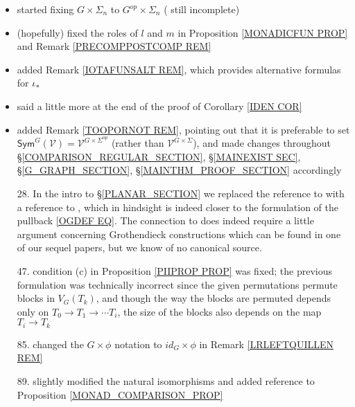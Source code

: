 \documentclass{article}
\begin{document}
\begin{itemize}
	\item started fixing $G \times \Sigma_n$ 
	to 
	$G^{op} \times \Sigma_n$
	({\color{red} still incomplete})
	
	\item (hopefully) fixed the roles of $l$ and $m$ in 
	Proposition \ref{MONADICFUN PROP} and
	Remark \ref{PRECOMPPOSTCOMP REM}
	
	\item added Remark \ref{IOTAFUNSALT REM},
	which provides alternative formulas for
	$\iota_{\**}$
	
	\item said a little more at the end of the proof of
	Corollary \ref{IDEN COR}
	
	\item added Remark \ref{TOOPORNOT REM}, pointing out that it is preferable to set
	$\mathsf{Sym}^G(\mathcal{V}) = 
	\mathcal{V}^{G \times \Sigma^{op}}$
	(rather than $\mathcal{V}^{G \times \Sigma}$),
	and made changes throughout 
	\S \ref{COMPARISON_REGULAR_SECTION},
	\S \ref{MAINEXIST SEC},
	\S \ref{G_GRAPH_SECTION},
	\S \ref{MAINTHM_PROOF_SECTION}
	accordingly
	
	
	\item[28.] In the intro to \S \ref{PLANAR_SECTION}
	we replaced the reference to 
	\cite[Prop. 5.47]{Pe17}
	with a reference to 
	\cite[Def. 5.44]{Pe17},
	which in hindsight is indeed closer 
	to the formulation of the pullback \eqref{OGDEF EQ}.
	The connection to \cite[Prop. 5.47]{Pe17}
	does indeed require a little argument concerning Grothendieck constructions {\color{red} which can be found in one of our sequel papers}, 
	but we know of no canonical source.
	
	\item[47.] condition (c) in Proposition \ref{PIIPROP PROP}
	was fixed; the previous formulation was technically incorrect since the given permutations
	permute blocks in $V_G(T_k)$,
	and though the way the blocks
	are permuted depends only on 
	$T_0 \to T_1 \to \cdots T_i$,
	the size of the blocks also depends on the map 
	$T_i \to T_k$ 
	
	\item[85.] changed the $G \times \phi$ notation 
	to $id_G \times \phi$ in Remark \ref{LRLEFTQUILLEN REM}
	
	\item[89.] slightly modified the natural isomorphisms and added reference to Proposition \ref{MONAD_COMPARISON_PROP} 
\end{itemize}
\end{document}
